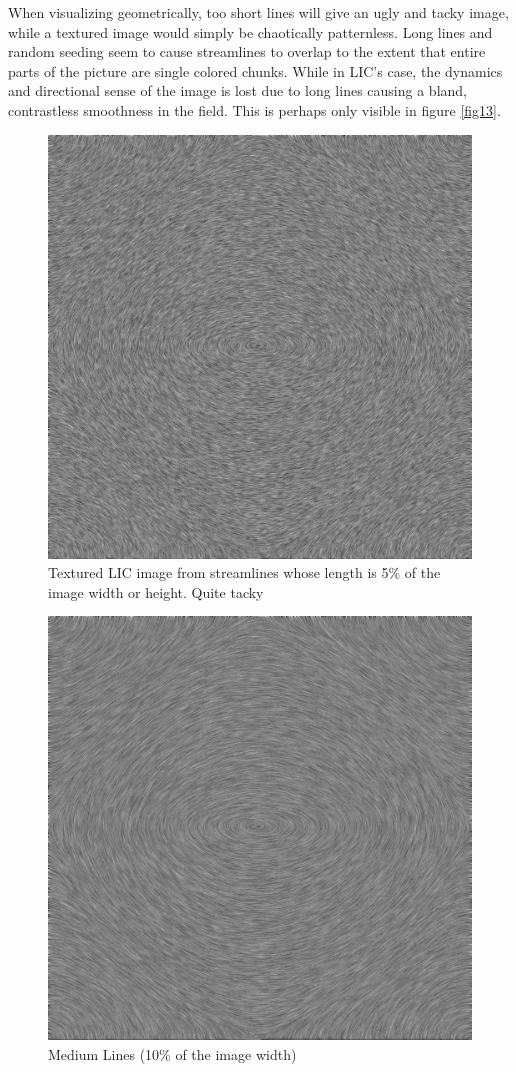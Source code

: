 \documentclass[a4paper,10pt]{report}
\begin{document}
When visualizing geometrically, too short lines will give an ugly and tacky image, while a textured image would simply be chaotically patternless.
Long lines and random seeding seem to cause streamlines to overlap to the extent that entire parts of the picture are single colored chunks.
While in LIC's case, the dynamics and directional sense of the image is lost due to long lines causing a bland, contrastless smoothness in the field. This is perhaps only visible in figure \ref{fig13}.
\clearpage
\begin{figure}\centering
 \includegraphics[width=0.7\linewidth]{metsim_linelength_5_highdef.jpg}
 \caption{Textured LIC image from streamlines whose length is 5\% of the image width or height. Quite tacky}
 \label{fig8}
\end{figure}
\begin{figure}\centering
 \includegraphics[width=0.7\linewidth]{metsim_linelength_10_highdef.jpg}
 \caption{Medium Lines (10\% of the image width)}
 \label{fig9}
\end{figure}
\end{document}
